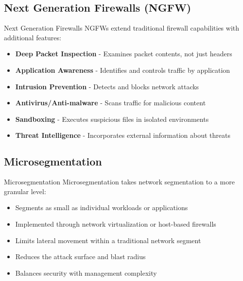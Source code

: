 \subsection{Next Generation Firewalls (NGFW)}

\begin{definition}{Next Generation Firewalls}
NGFWs extend traditional firewall capabilities with additional features:
\begin{itemize}
    \item \textbf{Deep Packet Inspection} - Examines packet contents, not just headers
    \item \textbf{Application Awareness} - Identifies and controls traffic by application
    \item \textbf{Intrusion Prevention} - Detects and blocks network attacks
    \item \textbf{Antivirus/Anti-malware} - Scans traffic for malicious content
    \item \textbf{Sandboxing} - Executes suspicious files in isolated environments
    \item \textbf{Threat Intelligence} - Incorporates external information about threats
\end{itemize}
\end{definition}

\subsection{Microsegmentation}

\begin{definition}{Microsegmentation}
Microsegmentation takes network segmentation to a more granular level:
\begin{itemize}
    \item Segments as small as individual workloads or applications
    \item Implemented through network virtualization or host-based firewalls
    \item Limits lateral movement within a traditional network segment
    \item Reduces the attack surface and blast radius
    \item Balances security with management complexity
\end{itemize}
\end{definition}

